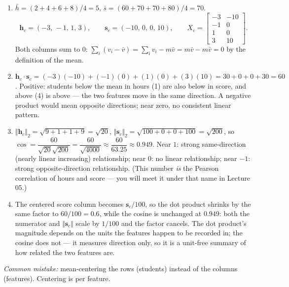 \documentclass[
  11pt,
]{article}
\begin{document}
\begin{solutionbox}

\begin{enumerate}
\def\labelenumi{(\alph{enumi})}
\item
  \(\bar h = (2+4+6+8)/4 = 5\), \(\bar s = (60+70+70+80)/4 = 70\).
  \[\mathbf{h}_c = (-3,\,-1,\,1,\,3), \qquad \mathbf{s}_c = (-10,\,0,\,0,\,10), \qquad
  X_c = \begin{bmatrix} -3 & -10\\ -1 & 0\\ 1 & 0\\ 3 & 10\end{bmatrix}.\]
  Both columns sum to \(0\):
  \(\sum_i (v_i - \bar v) = \sum_i v_i - m\bar v = m\bar v - m\bar v = 0\)
  by the definition of the mean.
\item
  \(\mathbf{h}_c\cdot\mathbf{s}_c = (-3)(-10) + (-1)(0) + (1)(0) + (3)(10) = 30 + 0 + 0 + 30 = 60\).
  Positive: students below the mean in hours (1) are also below in
  score, and above (4) is above --- the two features move in the same
  direction. A negative product would mean opposite directions; near
  zero, no consistent linear pattern.
\item
  \(\Vert\mathbf{h}_c\Vert_2 = \sqrt{9+1+1+9} = \sqrt{20}\),
  \(\Vert\mathbf{s}_c\Vert_2 = \sqrt{100+0+0+100} = \sqrt{200}\), so
  \(\cos = \dfrac{60}{\sqrt{20}\sqrt{200}} = \dfrac{60}{\sqrt{4000}} \approx \dfrac{60}{63.25} \approx 0.949\).
  Near \(1\): strong same-direction (nearly linear increasing)
  relationship; near \(0\): no linear relationship; near \(-1\): strong
  opposite-direction relationship. (This number \emph{is} the Pearson
  correlation of hours and score --- you will meet it under that name in
  Lecture 05.)
\item
  The centered score column becomes \(\mathbf{s}_c/100\), so the dot
  product shrinks by the same factor to \(60/100 = 0.6\), while the
  cosine is unchanged at \(0.949\): both the numerator and
  \(\Vert\mathbf{s}_c\Vert\) scale by \(1/100\) and the factor cancels.
  The dot product's magnitude depends on the units the features happen
  to be recorded in; the cosine does not --- it measures direction only,
  so it is a unit-free summary of how related the two features are.
\end{enumerate}

\emph{Common mistake:} mean-centering the rows (students) instead of the
columns (features). Centering is per feature.

\end{solutionbox}
\end{document}
